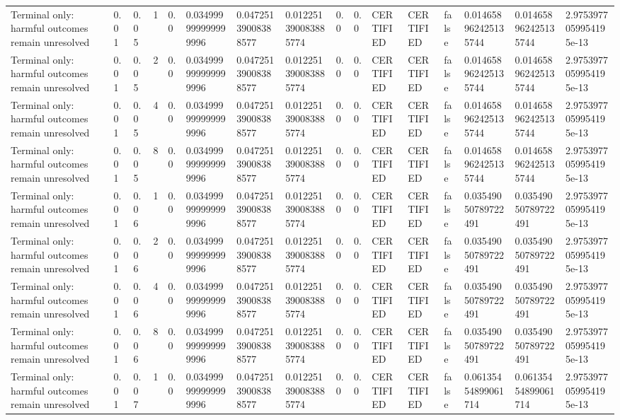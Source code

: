 \begin{tabular}{llllllllllllllll}
Terminal only: harmful outcomes remain unresolved & 0.01 & 0.05 & 1 & 0.0 & 0.034999999999999996 & 0.04725139008388577 & 0.012251390083885774 & 0.0 & 0.0 & CERTIFIED & CERTIFIED & false & 0.014658962425135744 & 0.014658962425135744 & 2.9753977059954195e-13 \\
Terminal only: harmful outcomes remain unresolved & 0.01 & 0.05 & 2 & 0.0 & 0.034999999999999996 & 0.04725139008388577 & 0.012251390083885774 & 0.0 & 0.0 & CERTIFIED & CERTIFIED & false & 0.014658962425135744 & 0.014658962425135744 & 2.9753977059954195e-13 \\
Terminal only: harmful outcomes remain unresolved & 0.01 & 0.05 & 4 & 0.0 & 0.034999999999999996 & 0.04725139008388577 & 0.012251390083885774 & 0.0 & 0.0 & CERTIFIED & CERTIFIED & false & 0.014658962425135744 & 0.014658962425135744 & 2.9753977059954195e-13 \\
Terminal only: harmful outcomes remain unresolved & 0.01 & 0.05 & 8 & 0.0 & 0.034999999999999996 & 0.04725139008388577 & 0.012251390083885774 & 0.0 & 0.0 & CERTIFIED & CERTIFIED & false & 0.014658962425135744 & 0.014658962425135744 & 2.9753977059954195e-13 \\
Terminal only: harmful outcomes remain unresolved & 0.01 & 0.06 & 1 & 0.0 & 0.034999999999999996 & 0.04725139008388577 & 0.012251390083885774 & 0.0 & 0.0 & CERTIFIED & CERTIFIED & false & 0.03549050789722491 & 0.03549050789722491 & 2.9753977059954195e-13 \\
Terminal only: harmful outcomes remain unresolved & 0.01 & 0.06 & 2 & 0.0 & 0.034999999999999996 & 0.04725139008388577 & 0.012251390083885774 & 0.0 & 0.0 & CERTIFIED & CERTIFIED & false & 0.03549050789722491 & 0.03549050789722491 & 2.9753977059954195e-13 \\
Terminal only: harmful outcomes remain unresolved & 0.01 & 0.06 & 4 & 0.0 & 0.034999999999999996 & 0.04725139008388577 & 0.012251390083885774 & 0.0 & 0.0 & CERTIFIED & CERTIFIED & false & 0.03549050789722491 & 0.03549050789722491 & 2.9753977059954195e-13 \\
Terminal only: harmful outcomes remain unresolved & 0.01 & 0.06 & 8 & 0.0 & 0.034999999999999996 & 0.04725139008388577 & 0.012251390083885774 & 0.0 & 0.0 & CERTIFIED & CERTIFIED & false & 0.03549050789722491 & 0.03549050789722491 & 2.9753977059954195e-13 \\
Terminal only: harmful outcomes remain unresolved & 0.01 & 0.07 & 1 & 0.0 & 0.034999999999999996 & 0.04725139008388577 & 0.012251390083885774 & 0.0 & 0.0 & CERTIFIED & CERTIFIED & false & 0.06135454899061714 & 0.06135454899061714 & 2.9753977059954195e-13 \\

\end{tabular}
